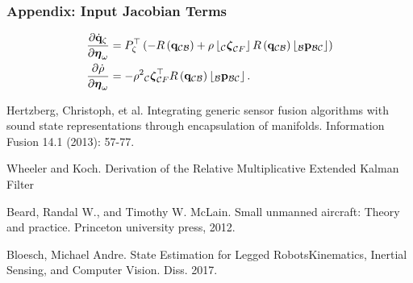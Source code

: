 \documentclass{beamer}
\begin{document}
\begin{frame}
\frametitle{Appendix: Input Jacobian Terms}
\begin{align}
\dfrac{\partial\dot{{\bf q}}_{\zeta}}{\partial\boldsymbol{\eta}_{\omega}} & =P_{\zeta}^{\top}\left(-R\left({\bf q}_{\mathcal{C}\mathcal{B}}\right)+\rho\left\lfloor _{\mathcal{C}}\boldsymbol{\zeta}_{\mathcal{C}F}\right\rfloor R\left({\bf q}_{\mathcal{C}\mathcal{B}}\right)\left\lfloor _{\mathcal{B}}{\bf p}_{\mathcal{B}\mathcal{C}}\right\rfloor \right)\\
\dfrac{\partial\dot{\rho}}{\partial\boldsymbol{\eta}_{\omega}} & =-\rho^{2}{}_{\mathcal{C}}\boldsymbol{\zeta}_{\mathcal{C}F}^{\top}R\left({\bf q}_{\mathcal{C}\mathcal{B}}\right)\left\lfloor _{\mathcal{B}}{\bf p}_{\mathcal{B}\mathcal{C}}\right\rfloor .
\end{align}
\end{frame}





 


\begin{thebibliography}{1}
Hertzberg, Christoph, et al. \textquotedbl{}Integrating
generic sensor fusion algorithms with sound state representations
through encapsulation of manifolds.\textquotedbl{} Information Fusion
14.1 (2013): 57-77.

Wheeler and Koch. \textquotedbl{}Derivation of the
Relative Multiplicative Extended Kalman Filter\textquotedbl{}

Beard, Randal W., and Timothy W. McLain. \textquotedbl{}Small
unmanned aircraft: Theory and practice\textquotedbl{}. Princeton university
press, 2012.

Bloesch, Michael Andre. State Estimation for Legged
Robots\textendash Kinematics, Inertial Sensing, and Computer Vision.
Diss. 2017.\end{thebibliography}
\end{document}
